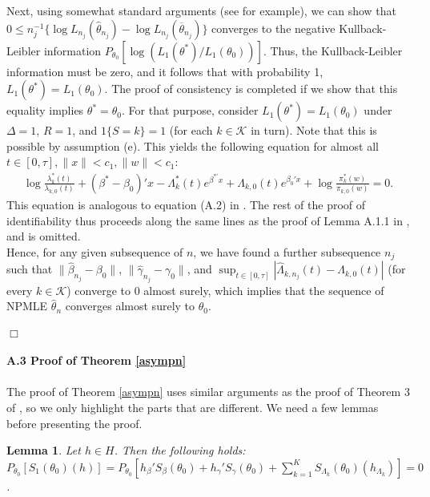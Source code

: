 \documentclass{statsoc}
\newtheorem{lemma}[theorem]{Lemma}
\begin{document}
Next, using somewhat standard arguments (see \cite{parner} for example), we can show that $0\leq n_j^{-1}\{\log L_{n_j}(\widehat\theta_{n_j})-\log L_{n_j}(\overline\theta_{n_j})\}$ converges to the negative Kullback-Leibler information $P_{\theta_0}[\log(L_1(\theta^\ast)\slash L_1(\theta_0))]$. Thus, the Kullback-Leibler information must be zero, and it follows that with probability 1, $L_1(\theta^\ast)=L_1(\theta_0)$. The proof of consistency is completed if we show that this equality implies $\theta^\ast=\theta_0$. For that purpose, consider $L_1(\theta^\ast)=L_1(\theta_0)$ under $\Delta=1$, $R=1$, and $1\{S=k\}=1$ (for each $k\in \mathcal K$ in turn). Note that this is possible by assumption (e). This yields the following equation for almost all $t\in[0,\tau], \|x\|<c_1, \|w\|<c_1$:
\begin{eqnarray*}
\log\frac{\lambda_k^\ast(t)}{\lambda_{k,0}(t)}+\left(\beta^\ast-\beta_0\right)'x-\Lambda_k^\ast(t)e^{\beta^{\ast'}x}+\Lambda_{k,0}(t)e^{\beta_0'x}+\log\frac{\pi^\ast_k(w)}{\pi_{k,0}(w)}=0.
\end{eqnarray*}
This equation is analogous to equation (A.2) in \cite{chen99}. The rest of the proof of identifiability thus proceeds along the same lines as the proof of Lemma A.1.1 in \cite{chen99}, and is omitted.
\\
 Hence, for any given subsequence of $n$, we have found a further subsequence $n_j$ such that $\|\widehat\beta_{n_j}-\beta_0\|$, $\|\widehat\gamma_{n_j}-\gamma_0\|$, and $\sup_{t\in[0,\tau]}|\widehat\Lambda_{k,n_j}(t)-\Lambda_{k,0}(t)|$ (for every $k\in\mathcal K$) converge to 0 almost surely, which implies that the sequence of NPMLE $\widehat\theta_n$ converges almost surely to $\theta_0$.
\\
\\
$\Box$
\\
\\
\textbf{A.3 Proof of Theorem \ref{asympn}}
\\
\\
The proof of Theorem \ref{asympn} uses similar arguments as the proof of Theorem 3 of \cite{fang05}, so we only highlight the parts that are different. We need a few lemmas before presenting the proof.
\begin{lemma}\label{espsc0}
Let $h\in H$. Then the following holds: $P_{\theta_0}\left[S_1(\theta_0)(h)\right]=P_{\theta_0}[h_\beta' S_\beta(\theta_0)+ h_\gamma'S_\gamma(\theta_0)+\sum_{k=1}^K S_{\Lambda_k}(\theta_0)(h_{\Lambda_k})]=0$.
\end{lemma}
\end{document}
